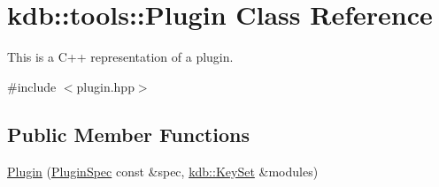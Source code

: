 \hypertarget{classkdb_1_1tools_1_1Plugin}{\section{kdb\+:\+:tools\+:\+:Plugin Class Reference}
\label{classkdb_1_1tools_1_1Plugin}
}


This is a C++ representation of a plugin.  




{\ttfamily \#include $<$plugin.\+hpp$>$}

\subsection*{Public Member Functions}
\begin{DoxyCompactItemize}
\item 
\hypertarget{classkdb_1_1tools_1_1Plugin_a8fdab835766bab1d1a992731c6863b9f}{\hyperlink{classkdb_1_1tools_1_1Plugin_a8fdab835766bab1d1a992731c6863b9f}{Plugin} (\hyperlink{classkdb_1_1tools_1_1PluginSpec}{Plugin\+Spec} const \&spec, \hyperlink{classkdb_1_1KeySet}{kdb\+::\+Key\+Set} \&modules)}\label{classkdb_1_1tools_1_1Plugin_a8fdab835766bab1d1a992731c6863b9f}


\end{DoxyCompactItemize}
